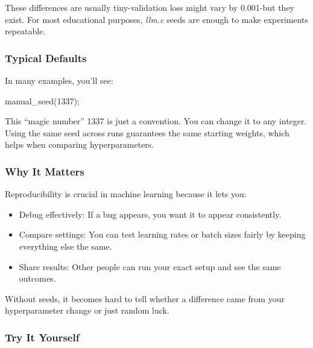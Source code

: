 \documentclass[
  letterpaper,
  DIV=11,
  numbers=noendperiod]{scrreprt}
\newenvironment{Shaded}{\begin{snugshade}}{\end{snugshade}}
\newcommand{\DecValTok}[1]{\textcolor[rgb]{0.68,0.00,0.00}{#1}}
\newcommand{\NormalTok}[1]{\textcolor[rgb]{0.00,0.23,0.31}{#1}}
\newcommand{\OperatorTok}[1]{\textcolor[rgb]{0.37,0.37,0.37}{#1}}
\providecommand{\tightlist}{%
  \setlength{\itemsep}{0pt}\setlength{\parskip}{0pt}}
\begin{document}
These differences are usually tiny-validation loss might vary by
0.001-but they exist. For most educational purposes, \emph{llm.c} seeds
are enough to make experiments repeatable.

\subsubsection{Typical Defaults}\label{typical-defaults}

In many examples, you'll see:

\begin{Shaded}
\begin{Highlighting}[]
\NormalTok{manual\_seed}\OperatorTok{(}\DecValTok{1337}\OperatorTok{);}
\end{Highlighting}
\end{Shaded}

This ``magic number'' 1337 is just a convention. You can change it to
any integer. Using the same seed across runs guarantees the same
starting weights, which helps when comparing hyperparameters.

\subsubsection{Why It Matters}\label{why-it-matters-6}

Reproducibility is crucial in machine learning because it lets you:

\begin{itemize}
\tightlist
\item
  Debug effectively: If a bug appears, you want it to appear
  consistently.
\item
  Compare settings: You can test learning rates or batch sizes fairly by
  keeping everything else the same.
\item
  Share results: Other people can run your exact setup and see the same
  outcomes.
\end{itemize}

Without seeds, it becomes hard to tell whether a difference came from
your hyperparameter change or just random luck.

\subsubsection{Try It Yourself}\label{try-it-yourself-6}
\end{document}
